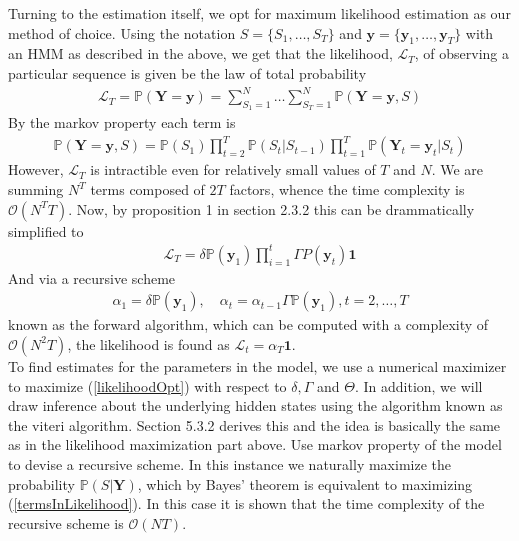 Turning to the estimation itself, we opt for  
 maximum likelihood estimation as our method of choice. Using the notation $S = \{S_1,\dots, S_T\}$ and $\mathbf{y} = \{\mathbf{y}_1,\dots, \mathbf{y}_T\}$ with an HMM as described in the above, we get that the likelihood, $\mathcal{L}_T$, of observing a particular sequence is given be the law of total probability
\begin{align}
    \mathcal{L}_T = \mathbb{P}(\mathbf{Y} = \mathbf{y}) = \sum_{S_1 = 1}^N\dots \sum_{S_T = 1}^N \mathbb{P}(\mathbf{Y} = \mathbf{y}, S)
\end{align}
By the markov property each term is
\begin{align}
    \mathbb{P}(\mathbf{Y} = \mathbf{y}, S) = \mathbb{P}(S_1)\prod_{t = 2}^T \mathbb{P}(S_t | S_{t-1})\prod_{t = 1}^T \mathbb{P}(\mathbf{Y}_t = \mathbf{y}_t | S_t) 
    \label{termsInLikelihood}
\end{align}
However, $\mathcal{L}_T$ is intractible even for relatively small values of $T$ and $N$. We are summing $N^T$ terms composed of $2T$ factors, whence the time complexity is $\mathcal{O}\left(N^TT\right)$. Now, by proposition 1 in section 2.3.2 \cite{HHMForTimesSeries} this can be drammatically simplified to
\begin{align}
    \mathcal{L}_T = \delta\mathbb{P}(\mathbf{y}_1)\prod_{i = 1}^{t}\Gamma P(\mathbf{y}_t)\mathbf{1}
    \label{likelihoodOpt}
\end{align}
And via a recursive scheme
\begin{align}
    \alpha_1 = \delta\mathbb{P}(\mathbf{y}_1), \quad \alpha_t = \alpha_{t-1}\Gamma\mathbb{P}(\mathbf{y}_1), t = 2,\dots, T
\end{align}
 known as the forward algorithm, which can be computed with a complexity of $\mathcal{O}(N^2T)$, the likelihood is found as $\mathcal{L}_t = \alpha_T\mathbf{1}$.\\ To find estimates for the parameters in the model, we use a numerical maximizer to maximize (\ref{likelihoodOpt}) with respect to $\delta, \Gamma$ and $\Theta$. In addition, we will draw inference about the underlying hidden states using the algorithm known as the viteri algorithm. Section 5.3.2 \cite{HHMForTimesSeries}  derives this and the idea is basically the same as in the likelihood maximization part above. Use markov property of the model to devise a recursive scheme. In this instance we naturally maximize the probability $\mathbb{P}(S | \mathbf{Y})$, which by Bayes' theorem is equivalent to maximizing (\ref{termsInLikelihood}). In this case it is shown that the time complexity of the recursive scheme is $\mathcal{O}(NT)$.
